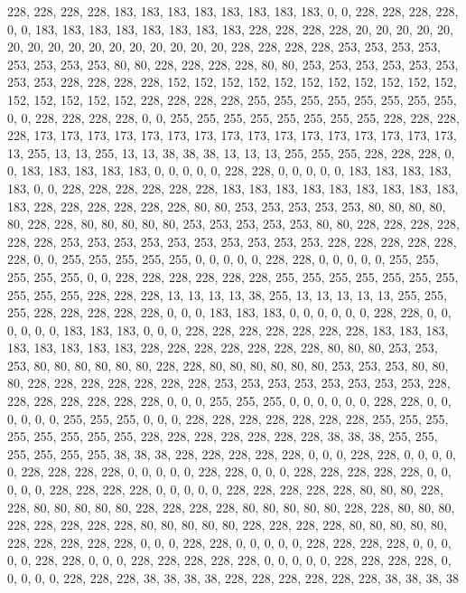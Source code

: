 {	228, 228, 228, 228, 183, 183, 183, 183, 183, 183, 183, 183, 0,   0,   228, 228, 228, 228, 0,   0,   183, 183, 183, 183, 183, 183, 183, 183, 228, 228, 228, 228, 20,  20,  20,  20,  20,  20,  20,  20,  20,  20,  20,  20,  20,  20,  20,  20,  228, 228, 228, 228, 253, 253, 253, 253, 253, 253, 253, 253, 80,  80,  228, 228, 228, 228, 80,  80,  253, 253, 253, 253, 253, 253, 253, 253, 228, 228, 228, 228, 152, 152, 152, 152, 152, 152, 152, 152, 152, 152, 152, 152, 152, 152, 152, 152, 228, 228, 228, 228, 255, 255, 255, 255, 255, 255, 255, 255, 0,   0,   228, 228, 228, 228, 0,   0,   255, 255, 255, 255, 255, 255, 255, 255, 228, 228, 228, 228, 173, 173, 173, 173, 173, 173, 173, 173, 173, 173, 173, 173, 173, 173, 173, 173, 13,  255, 13,  13,  255, 13,  13,  38,  38,  38,  13,  13,  13,  255, 255, 255, 
	228, 228, 228, 0,   0,   183, 183, 183, 183, 183, 0,   0,   0,   0,   0,   228, 228, 0,   0,   0,   0,   0,   183, 183, 183, 183, 183, 0,   0,   228, 228, 228, 228, 228, 228, 183, 183, 183, 183, 183, 183, 183, 183, 183, 183, 228, 228, 228, 228, 228, 228, 80,  80,  253, 253, 253, 253, 253, 80,  80,  80,  80,  80,  228, 228, 80,  80,  80,  80,  80,  253, 253, 253, 253, 253, 80,  80,  228, 228, 228, 228, 228, 228, 253, 253, 253, 253, 253, 253, 253, 253, 253, 253, 228, 228, 228, 228, 228, 228, 0,   0,   255, 255, 255, 255, 255, 0,   0,   0,   0,   0,   228, 228, 0,   0,   0,   0,   0,   255, 255, 255, 255, 255, 0,   0,   228, 228, 228, 228, 228, 228, 255, 255, 255, 255, 255, 255, 255, 255, 255, 255, 228, 228, 228, 13,  13,  13,  13,  38,  255, 13,  13,  13,  13,  13,  255, 255, 255, 228, 228, 
	228, 228, 228, 0,   0,   0,   183, 183, 183, 0,   0,   0,   0,   0,   0,   228, 228, 0,   0,   0,   0,   0,   0,   183, 183, 183, 0,   0,   0,   228, 228, 228, 228, 228, 228, 228, 183, 183, 183, 183, 183, 183, 183, 183, 228, 228, 228, 228, 228, 228, 228, 80,  80,  80,  253, 253, 253, 80,  80,  80,  80,  80,  80,  228, 228, 80,  80,  80,  80,  80,  80,  253, 253, 253, 80,  80,  80,  228, 228, 228, 228, 228, 228, 228, 253, 253, 253, 253, 253, 253, 253, 253, 228, 228, 228, 228, 228, 228, 228, 0,   0,   0,   255, 255, 255, 0,   0,   0,   0,   0,   0,   228, 228, 0,   0,   0,   0,   0,   0,   255, 255, 255, 0,   0,   0,   228, 228, 228, 228, 228, 228, 228, 255, 255, 255, 255, 255, 255, 255, 255, 228, 228, 228, 228, 228, 228, 228, 38,  38,  38,  255, 255, 255, 255, 255, 255, 38,  38,  38,  228, 
	228, 228, 228, 228, 0,   0,   0,   228, 228, 0,   0,   0,   0,   0,   228, 228, 228, 228, 0,   0,   0,   0,   0,   228, 228, 0,   0,   0,   228, 228, 228, 228, 228, 0,   0,   0,   0,   0,   228, 228, 228, 228, 0,   0,   0,   0,   0,   228, 228, 228, 228, 228, 80,  80,  80,  228, 228, 80,  80,  80,  80,  80,  228, 228, 228, 228, 80,  80,  80,  80,  80,  228, 228, 80,  80,  80,  228, 228, 228, 228, 228, 80,  80,  80,  80,  80,  228, 228, 228, 228, 80,  80,  80,  80,  80,  228, 228, 228, 228, 228, 0,   0,   0,   228, 228, 0,   0,   0,   0,   0,   228, 228, 228, 228, 0,   0,   0,   0,   0,   228, 228, 0,   0,   0,   228, 228, 228, 228, 228, 0,   0,   0,   0,   0,   228, 228, 228, 228, 0,   0,   0,   0,   0,   228, 228, 228, 38,  38,  38,  38,  228, 228, 228, 228, 228, 228, 38,  38,  38,  38   
}

